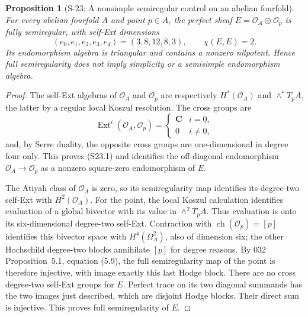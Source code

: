 \documentclass[11pt,a4paper]{article}
\newtheorem{proposition}[theorem]{Proposition}
\theoremstyle{definition}
\begin{document}
\begin{proposition}[S-23: A nonsimple semiregular control on an abelian fourfold]
\label{prop:semireg-nonsimple-control}
For every abelian fourfold $A$ and point $p\in A$, the
perfect sheaf
$E=\mathcal O_A\oplus\mathcal O_p$ is fully semiregular,
with self-Ext dimensions
\[
 (e_0,e_1,e_2,e_3,e_4)=(3,8,12,8,3),
 \qquad \chi(E,E)=2.
 \tag{S23.1}
\]
Its endomorphism algebra is triangular and contains a
nonzero nilpotent. Hence full semiregularity does not
imply simplicity or a semisimple endomorphism algebra.
\end{proposition}
\begin{proof}
The self-Ext algebras of $\mathcal O_A$ and $\mathcal O_p$
are respectively $H^*(\mathcal O_A)$ and
$\wedge^*T_pA$, the latter by a regular local Koszul
resolution. The cross groups are
\[
 \operatorname{Ext}^i(\mathcal O_A,\mathcal O_p)=
 \begin{cases}\mathbf C&i=0,\\0&i\ne0,\end{cases}
\]
and, by Serre duality, the opposite cross groups are
one-dimensional in degree four only. This proves (S23.1)
and identifies the off-diagonal endomorphism
$\mathcal O_A\to\mathcal O_p$ as a nonzero square-zero
endomorphism of $E$.

The Atiyah class of $\mathcal O_A$ is zero, so its
semiregularity map identifies its degree-two self-Ext with
$H^2(\mathcal O_A)$. For the point, the local Koszul
calculation identifies evaluation of a global bivector
with its value in $\wedge^2T_pA$. Thus evaluation is onto
its six-dimensional degree-two self-Ext.
Contraction with $\operatorname{ch}(\mathcal O_p)=[p]$
identifies this bivector space with
$H^4(\Omega_A^2)$, also of dimension six; the other
Hochschild degree-two blocks annihilate $[p]$ for degree
reasons. By 032 Proposition~5.1, equation (5.9), the full
semiregularity map of the point is therefore injective,
with image exactly this last Hodge block.
There are no cross degree-two self-Ext groups for $E$.
Perfect trace on its two diagonal summands has the two
images just described, which are disjoint Hodge blocks.
Their direct sum is injective. This proves full
semiregularity of $E$.
\end{proof}
\end{document}
